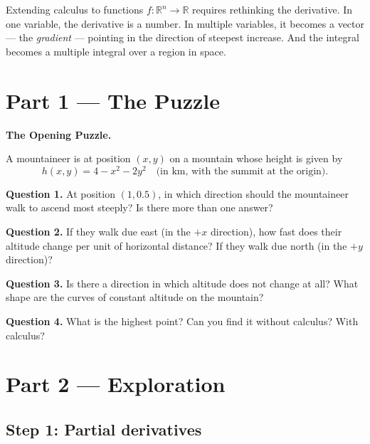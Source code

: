 \documentclass[12pt, a4paper]{article}
\begin{document}
\medskip
Extending calculus to functions $f : \mathbb{R}^n \to \mathbb{R}$ requires rethinking the derivative. In one variable, the derivative is a number. In multiple variables, it becomes a vector --- the \emph{gradient} --- pointing in the direction of steepest increase. And the integral becomes a multiple integral over a region in space.

\newpage

\section{Part 1 \texorpdfstring{---}{--} The Puzzle}

\begin{puzzlebox}
\textbf{The Opening Puzzle.}

A mountaineer is at position $(x, y)$ on a mountain whose height is given by
\[
  h(x,y) = 4 - x^2 - 2y^2 \quad \text{(in km, with the summit at the origin)}.
\]

\textbf{Question 1.} At position $(1, 0.5)$, in which direction should the mountaineer walk to ascend most steeply? Is there more than one answer?

\textbf{Question 2.} If they walk due east (in the $+x$ direction), how fast does their altitude change per unit of horizontal distance? If they walk due north (in the $+y$ direction)?

\textbf{Question 3.} Is there a direction in which altitude does not change at all? What shape are the curves of constant altitude on the mountain?

\textbf{Question 4.} What is the highest point? Can you find it without calculus? With calculus?
\end{puzzlebox}

\section{Part 2 \texorpdfstring{---}{--} Exploration}

\subsection{Step 1: Partial derivatives}
\end{document}
